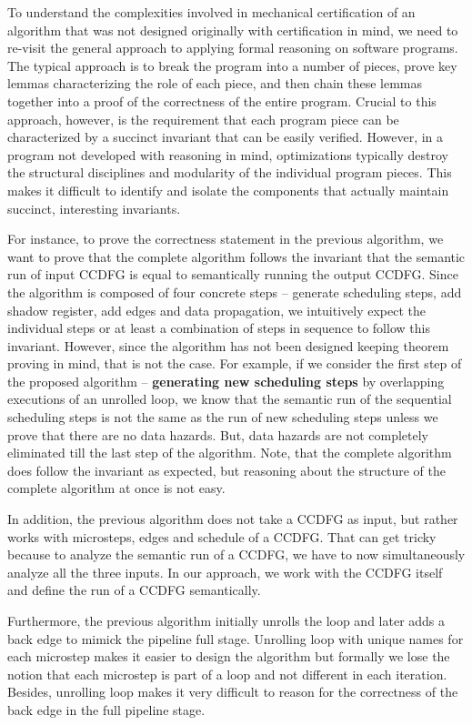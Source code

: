 To understand the complexities involved in mechanical
certification of an algorithm that was not designed
originally with certification in mind, we need to re-visit
the general approach to applying formal reasoning on
software programs.  The typical approach is to break the
program into a number of pieces, prove key lemmas
characterizing the role of each piece, and then chain these
lemmas together into a proof of the correctness of the
entire program. Crucial to this approach, however, is the
requirement that each program piece can be characterized by
a succinct invariant that can be easily verified.  However,
in a program not developed with reasoning in mind,
optimizations typically destroy the structural disciplines
and modularity of the individual program pieces. This makes it
difficult to identify and isolate the components that
actually maintain succinct, interesting invariants.

For instance, to prove the correctness statement in the previous algorithm, 
we want to prove that the complete algorithm follows
the invariant that the semantic run of input CCDFG is equal to semantically running the output CCDFG.
Since the algorithm is composed of four concrete steps -- generate scheduling steps, add shadow register,
add edges and data propagation, we intuitively expect the individual steps or at least a combination of steps in sequence to
follow this invariant. However, since the algorithm has not been designed keeping theorem proving
in mind, that is not the case. For example, if
we consider the first step of the proposed algorithm -- {\bf generating new scheduling steps} by
overlapping executions of an unrolled loop, we know that the semantic run 
of the sequential scheduling steps is not the same as the run of new scheduling steps
unless we prove that there are no data hazards. But, data hazards are not completely eliminated till the last step of the algorithm. Note, that the complete algorithm
does follow the invariant as expected, but reasoning about the structure of the
complete algorithm at once is not easy.

In addition, the previous algorithm does not take a CCDFG as input, but rather
works with microsteps, edges and schedule of a CCDFG. That can get tricky because to analyze the
semantic run of a CCDFG, we have to now simultaneously analyze all the three inputs. In our approach,
we work with the CCDFG itself and define the run of a CCDFG semantically.

Furthermore, the previous algorithm initially unrolls the loop and later adds
a back edge to mimick the pipeline full stage. Unrolling loop with unique names
for each microstep makes it easier to design the algorithm but formally we lose the notion
that each microstep is part of a loop and not different in each iteration.
Besides, unrolling loop makes it very difficult to reason for the correctness of the
back edge in the
full pipeline stage.

